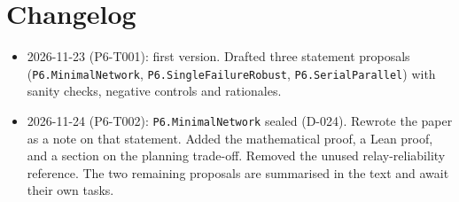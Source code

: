 \documentclass[11pt]{article}
\begin{document}
\section*{Changelog}
\begin{itemize}
\item 2026-11-23 (P6-T001): first version. Drafted three statement proposals
(\texttt{P6.MinimalNetwork}, \texttt{P6.SingleFailureRobust}, \texttt{P6.SerialParallel}) with sanity
checks, negative controls and rationales.
\item 2026-11-24 (P6-T002): \texttt{P6.MinimalNetwork} sealed (D-024). Rewrote the paper as a note
on that statement. Added the mathematical proof, a Lean proof, and a section on the planning trade-off.
Removed the unused relay-reliability reference. The two remaining proposals are summarised in the text and await their own tasks.
\end{itemize}



\end{document}
